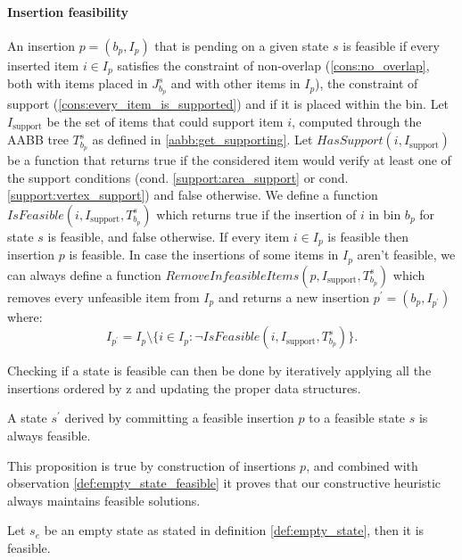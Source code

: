 \paragraph*{Insertion feasibility}
An insertion $p = (b_p, I_p)$ that is pending on a given state $s$ is feasible if every inserted item $i \in I_p$ satisfies the constraint of non-overlap (\ref{cons:no_overlap}, both with items placed in $J^s_{b_p}$ and with other items in $I_p$), the constraint of support (\ref{cons:every_item_is_supported}) and if it is placed within the bin.
Let $I_{\text{support}}$ be the set of items that could support item $i$, computed through the AABB tree $T^s_{b_p}$ as defined in \cref{aabb:get_supporting}.
Let $HasSupport(i, I_{\text{support}})$ be a function that returns true if the considered item would verify at least one of the support conditions (cond. \ref{support:area_support} or cond. \ref{support:vertex_support}) and false otherwise.
We define a function $IsFeasible(i, I_{\text{support}}, T^s_{b_p})$ which returns true if the insertion of $i$ in bin $b_p$ for state $s$ is feasible, and false otherwise.
If every item $i \in I_p$ is feasible then insertion $p$ is feasible.
In case the insertions of some items in $I_p$ aren't feasible, we can always define a function $RemoveInfeasibleItems(p, I_{\text{support}}, T^s_{b_p})$ which removes every unfeasible item from $I_p$ and returns a new insertion $p^\prime = (b_p, I_{p^\prime})$ where:
\begin{equation*}
    I_{p^\prime} = I_p \setminus \{i \in I_p : \lnot IsFeasible(i, I_{\text{support}}, T^s_{b_p})\}. \label{algo:remove_infeasible}
\end{equation*}

Checking if a state is feasible can then be done by iteratively applying all the insertions ordered by z and updating the proper data structures.
\begin{proposition}
    \label{prop:feasible_expansion}
    A state $s^\prime$ derived by committing a feasible insertion $p$ to a feasible state $s$ is always feasible.
\end{proposition}
This proposition is true by construction of insertions $p$, and combined with observation \ref{def:empty_state_feasible} it proves that our constructive heuristic always maintains feasible solutions. 
\begin{observation}
    \label{def:empty_state_feasible}
    Let $s_e$ be an empty state as stated in definition \ref{def:empty_state}, then it is feasible.
\end{observation}

